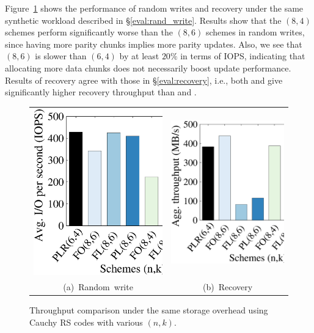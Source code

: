 Figure~\ref{fig:reserve_comparison} shows the performance of random writes 
and recovery under the same synthetic workload described in
\S\ref{eval:rand_write}.  Results show that the $(8,4)$
schemes perform significantly worse than the $(8,6)$ schemes in random writes,
since having more parity chunks implies more parity updates.  Also, we
see that \FO $(8,6)$ is slower than \PLR $(6,4)$ by at least $20\%$ in terms
of IOPS, indicating that allocating more data chunks does not necessarily
boost update performance. Results of recovery agree with those in
\S\ref{eval:recovery}, i.e., both \FO and \PLR give significantly higher
recovery throughput than \FL and \PL. 

\begin{figure}[!t]
\centering
\begin{tabular}{c@{\ }c}
\includegraphics[width=0.48\linewidth]{charts/reserve_overhead/eps/reserve_overhead_randw} & 
\includegraphics[width=0.48\linewidth]{charts/reserve_overhead/eps/reserve_overhead_recover}
\vspace{-3pt}\\
\mbox{\small (a) Random write} &
\mbox{\small (b) Recovery}
\end{tabular}
\vspace{-3pt}
\caption{Throughput comparison under the same storage
 overhead using Cauchy RS codes with various $(n,k)$.}
\label{fig:reserve_comparison}
\vspace{-6pt}
\end{figure}

